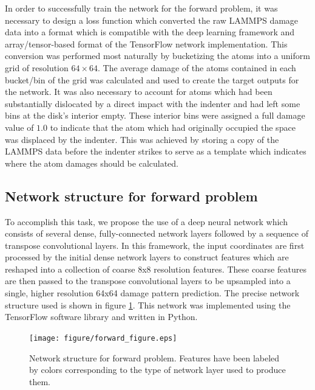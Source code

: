 In order to successfully train the network for the forward problem, it was necessary to design a loss function which converted the raw LAMMPS damage data into a format which is compatible with the deep learning framework and array/tensor-based format of the TensorFlow network implementation.  This conversion was performed most naturally by bucketizing the atoms into a uniform grid of resolution $64 \times 64$.  The average damage of the atoms contained in each bucket/bin of the grid was calculated and used to create the target outputs for the network.  It was also necessary to account for atoms which had been substantially dislocated by a direct impact with the indenter and had left some bins at the disk’s interior empty.  These interior bins were assigned a full damage value of $1.0$ to indicate that the atom which had originally occupied the space was displaced by the indenter.  This was achieved by storing a copy of the LAMMPS data before the indenter strikes to serve as a template which indicates where the atom damages should be calculated.


\subsection{Network structure for forward problem}
\label{forward_network}

To accomplish this task, we propose the use of a deep neural network which consists of several dense, fully-connected network layers followed by a sequence of transpose convolutional layers.  In this framework, the input coordinates are first processed by the initial dense network layers to construct features which are reshaped into a collection of coarse 8x8 resolution features.  These coarse features are then passed to the transpose convolutional layers to be upsampled into a single, higher resolution 64x64 damage pattern prediction.  The precise network structure used is shown in figure \ref{fig:forward}.  This network was implemented using the TensorFlow software library and written in Python.

\begin{figure}
  \centering
  \texttt{[image: figure/forward\_figure.eps]}
\caption{Network structure for forward problem.  Features have been labeled by colors corresponding to the type of network layer used to produce them.}
\label{fig:forward}       
\end{figure}

